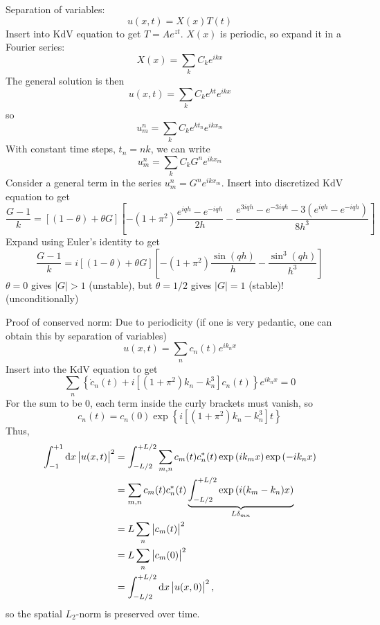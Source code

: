 Separation of variables:
\begin{equation}
u(x, t) = X(x) T(t)
\end{equation}
Insert into KdV equation to get $T = A e^{zt}$.
$X(x)$ is periodic, so expand it in a Fourier series:
\begin{equation}
X(x) = \sum_k C_k e^{ikx}
\end{equation}
The general solution is then
\begin{equation}
u(x, t) = \sum_k C_k e^{kt} e^{ikx}
\end{equation}
so
\begin{equation}
u_m^n = \sum_k C_k e^{kt_n} e^{ikx_m}
\end{equation}
With constant time steps, $t_n = nk$, we can write
\begin{equation}
u_m^n = \sum_k C_k G^n e^{ikx_m}
\end{equation}
Consider a general term in the series $u_m^n = G^n e^{ikx_m}$. Insert into discretized KdV equation to get
\begin{equation}
\frac{G-1}{k} = [(1-\theta)+\theta G] [-(1+\pi^2) \frac{e^{iqh}-e^{-iqh}}{2h} - \frac{e^{3iqh}-e^{-3iqh}-3(e^{iqh}-e^{-iqh})}{8h^3}]
\end{equation}
Expand using Euler's identity to get
\begin{equation}
\frac{G-1}{k} = i [(1-\theta)+\theta G] [-(1+\pi^2) \frac{\sin(qh)}{h} - \frac{\sin^3(qh)}{h^3}]
\end{equation}
$\theta = 0$ gives $|G| > 1$ (unstable), but $\theta = 1/2$ gives $|G| = 1$ (stable)! (unconditionally)

Proof of conserved norm:
Due to periodicity (if one is very pedantic, one can obtain this by separation of variables)
\begin{equation}
	u(x, t) = \sum_n c_n(t) e^{i k_n x}
\end{equation}
Insert into the KdV equation to get
\begin{equation}
	\sum_n \left\{ \dot{c}_n(t) + i [(1+\pi^2)k_n - k_n^3] c_n(t) \right\} e^{i k_n x}= 0
\end{equation}
For the sum to be $0$, each term inside the curly brackets must vanish, so
\begin{equation}
	c_n(t) = c_n(0) \exp{\left\{ i [(1+\pi^2)k_n - k_n^3] t \right\} }
\end{equation}
Thus,
\begin{equation}
\begin{split}
\int_{-1}^{+1} \dif x \left| u(x,t) \right|^2 &= \int_{-L/2}^{+L/2} \sum_{m,n} c_m(t) c_n^*(t) \exp{(i k_m x)} \exp{(-i k_n x)} \\
                                              &= \sum_{m,n} c_m(t) c_n^*(t) \underbrace{\int_{-L/2}^{+L/2} \exp{(i(k_m-k_n)x)}}_{L \delta_{m n}} \\
											  &= L \sum_n \left| c_m(t) \right|^2 \\
											  &= L \sum_n \left| c_m(0) \right|^2 \\
											  &= \int_{-L/2}^{+L/2} \dif x \left| u(x,0) \right|^2,
\end{split}
\end{equation}
so the spatial $L_2$-norm is preserved over time.
